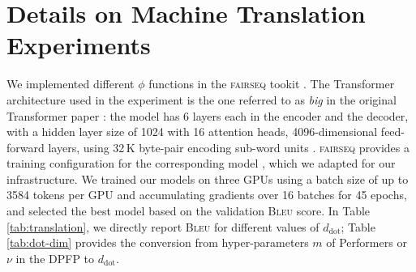 \documentclass{article}
\theoremstyle{definition}
\begin{document}
\begin{table}[h]


\end{table}

\section{Details on Machine Translation Experiments}
\label{app:mt}
We implemented different $\phi$ functions in the \textsc{fairseq} tookit \cite{OttEBFGNGA19}.
The Transformer architecture used in the experiment
is the one referred to as \textit{big} in the original Transformer paper \cite{trafo}:
the model has 6 layers each in the encoder and the decoder, with a hidden layer size of 1024
with 16 attention heads, 4096-dimensional feed-forward layers,
using 32\,K byte-pair encoding sub-word units \cite{sennrich16bpe}.
\textsc{fairseq} provides a training configuration for the corresponding model \cite{ott2018},
which we adapted for our infrastructure.
We trained our models on three GPUs using a batch size of up to 3584 tokens per GPU
and accumulating gradients over 16 batches for 45 epochs, and selected the best model
based on the validation \textsc{Bleu} score.
In Table \ref{tab:translation}, we directly report \textsc{Bleu} for different values of $d_\text{dot}$;
Table \ref{tab:dot-dim} provides the conversion from hyper-parameters $m$ of Performers or $\nu$ in the DPFP to $d_\text{dot}$.
\end{document}
